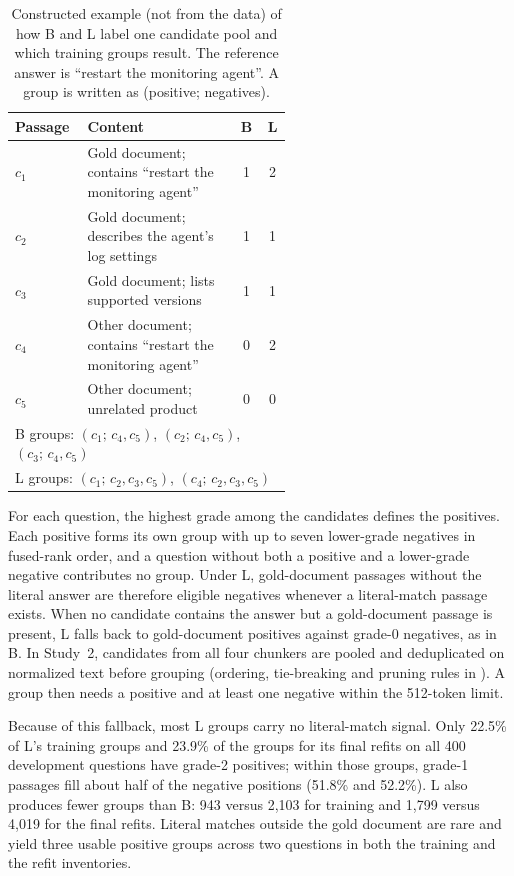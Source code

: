 \begin{table}[htbp]\centering\small
\caption{Constructed example (not from the data) of how B and L label one candidate pool and which training groups result. The reference answer is ``restart the monitoring agent''. A group is written as (positive; negatives).}\label{tab:toy}
\begin{tabular}{lp{0.55\linewidth}cc}\toprule
Passage & Content & B & L\\\midrule
$c_1$ & Gold document; contains ``restart the monitoring agent'' & 1 & 2\\
$c_2$ & Gold document; describes the agent's log settings & 1 & 1\\
$c_3$ & Gold document; lists supported versions & 1 & 1\\
$c_4$ & Other document; contains ``restart the monitoring agent'' & 0 & 2\\
$c_5$ & Other document; unrelated product & 0 & 0\\\midrule
\multicolumn{4}{l}{B groups: $(c_1;\,c_4,c_5)$, $(c_2;\,c_4,c_5)$, $(c_3;\,c_4,c_5)$}\\
\multicolumn{4}{l}{L groups: $(c_1;\,c_2,c_3,c_5)$, $(c_4;\,c_2,c_3,c_5)$}\\\bottomrule
\end{tabular}\end{table}

For each question, the highest grade among the candidates defines the positives. Each positive forms its own group with up to seven lower-grade negatives in fused-rank order, and a question without both a positive and a lower-grade negative contributes no group. Under L, gold-document passages without the literal answer are therefore eligible negatives whenever a literal-match passage exists. When no candidate contains the answer but a gold-document passage is present, L falls back to gold-document positives against grade-0 negatives, as in B. In Study~2, candidates from all four chunkers are pooled and deduplicated on normalized text before grouping (ordering, tie-breaking and pruning rules in ). A group then needs a positive and at least one negative within the 512-token limit.

Because of this fallback, most L groups carry no literal-match signal. Only 22.5\% of L's training groups and 23.9\% of the groups for its final refits on all 400 development questions have grade-2 positives; within those groups, grade-1 passages fill about half of the negative positions (51.8\% and 52.2\%). L also produces fewer groups than B: 943 versus 2,103 for training and 1,799 versus 4,019 for the final refits. Literal matches outside the gold document are rare and yield three usable positive groups across two questions in both the training and the refit inventories.

